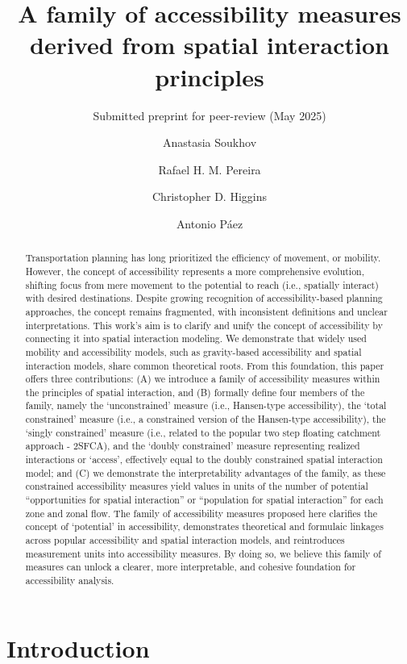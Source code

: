 \documentclass[
]{article}
\title{A family of accessibility measures derived from spatial
interaction principles}
\subtitle{Submitted preprint for peer-review (May 2025)}
\author{Anastasia Soukhov \and Rafael H. M. Pereira \and Christopher D.
Higgins \and Antonio Páez}
\date{}
\begin{document}
\maketitle
\begin{abstract}
Transportation planning has long prioritized the efficiency of movement,
or mobility. However, the concept of accessibility represents a more
comprehensive evolution, shifting focus from mere movement to the
potential to reach (i.e., spatially interact) with desired destinations.
Despite growing recognition of accessibility-based planning approaches,
the concept remains fragmented, with inconsistent definitions and
unclear interpretations. This work's aim is to clarify and unify the
concept of accessibility by connecting it into spatial interaction
modeling. We demonstrate that widely used mobility and accessibility
models, such as gravity-based accessibility and spatial interaction
models, share common theoretical roots. From this foundation, this paper
offers three contributions: (A) we introduce a family of accessibility
measures within the principles of spatial interaction, and (B) formally
define four members of the family, namely the `unconstrained' measure
(i.e., Hansen-type accessibility), the `total constrained' measure
(i.e., a constrained version of the Hansen-type accessibility), the
`singly constrained' measure (i.e., related to the popular two step
floating catchment approach - 2SFCA), and the `doubly constrained'
measure representing realized interactions or `access', effectively
equal to the doubly constrained spatial interaction model; and (C) we
demonstrate the interpretability advantages of the family, as these
constrained accessibility measures yield values in units of the number
of potential ``opportunities for spatial interaction'' or ``population
for spatial interaction'' for each zone and zonal flow. The family of
accessibility measures proposed here clarifies the concept of
`potential' in accessibility, demonstrates theoretical and formulaic
linkages across popular accessibility and spatial interaction models,
and reintroduces measurement units into accessibility measures. By doing
so, we believe this family of measures can unlock a clearer, more
interpretable, and cohesive foundation for accessibility analysis.
\end{abstract}

\section{Introduction}\label{introduction}
\end{document}
